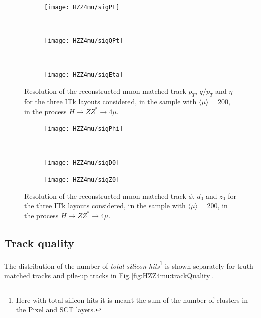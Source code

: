 \documentclass[a4paper,twoside,12pt]{book}
\begin{document}
\begin{figure}
\begin{subfigure}{\linewidth}
\centering
\texttt{[image: HZZ4mu/sigPt]}
\caption{}
\label{fig:HZZ4mu:sigPt}
\end{subfigure}\\[1ex]
\begin{subfigure}{\linewidth}
\centering
\texttt{[image: HZZ4mu/sigQPt]}
\caption{}
\label{fig:HZZ4mu:sigQPt}
\end{subfigure}\\[1ex]
\begin{subfigure}{\linewidth}
\centering
\texttt{[image: HZZ4mu/sigEta]}
\caption{}
\label{fig:HZZ4mu:sigEta}
\end{subfigure}
\caption{Resolution of the reconstructed muon matched track $p_{T}$, $q/p_{T}$ and $\eta$ for the three ITk layouts considered, in the sample with $\langle\mu\rangle = 200$, in the process $H \rightarrow ZZ^* \rightarrow 4\mu$.}
\label{fig:HZZ4mu:muonResolution-1}
\end{figure}

\begin{figure}
\begin{subfigure}{\linewidth}
\centering
\texttt{[image: HZZ4mu/sigPhi]}
\caption{}
\label{fig:HZZ4mu:sigPhi}
\end{subfigure}\\[1ex]
\begin{subfigure}{\linewidth}
\centering
\texttt{[image: HZZ4mu/sigD0]}
\caption{}
\label{fig:HZZ4mu:sigD0}
\end{subfigure}
\begin{subfigure}{\linewidth}
\centering
\texttt{[image: HZZ4mu/sigZ0]}
\caption{}
\label{fig:HZZ4mu:sigZ0}
\end{subfigure}
\caption{Resolution of the reconstructed muon matched track $\phi$, $d_{0}$ and $z_{0}$ for the three ITk layouts considered, in the sample with $\langle\mu\rangle = 200$, in the process $H \rightarrow ZZ^* \rightarrow 4\mu$.}
\label{fig:HZZ4mu:muonResolution-2}
\end{figure}


\subsection*{Track quality}
The distribution of the number of \textit{total silicon hits}\footnote{Here with total silicon hits it is meant the sum of the number
of clusters in the Pixel and SCT layers.} is shown separately for truth-matched tracks and pile-up tracks in
Fig.\ref{fig:HZZ4mu:trackQuality}.
\end{document}
